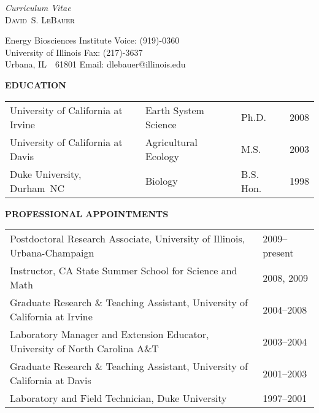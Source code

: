 \documentclass[10pt,twoside]{article}
\begin{document}
\setcounter{page}{1}
\pagestyle{fancy}
\chead{}
\rhead{\thepage}
\lfoot{}
\cfoot{}
\rfoot{}
\newcommand{\dslnote}{\csznote}
\thispagestyle{plain}

\begin{center}
{\textit{Curriculum Vitae}}\\
{\large\textsc{David~S. LeBauer}}\\
\end{center}

Energy Biosciences Institute \hfill Voice: (919)-0360\\
University of Illinois \hfill Fax: (217)-3637  \\
Urbana, IL~~61801 \hfill Email: dlebauer@illinois.edu\\

\bigskip\bigskip

\textbf{EDUCATION}
\begin{table}[h]
\begin{tabular}{ l l l l } 
University of California at Irvine & Earth System Science & Ph.D. & 2008\\
University of California at Davis & Agricultural Ecology & M.S. & 2003 \\
Duke University, Durham~NC & Biology & B.S. Hon. & 1998 \\
\end{tabular}
\end{table}


\textbf{PROFESSIONAL APPOINTMENTS}
\begin{table}[h]
\begin{tabular}{>{\raggedright}p{35.0em}<{} l }
  Postdoctoral Research Associate, University of Illinois, Urbana-Champaign &2009--present \\ 
  Instructor, CA State Summer School for Science and Math & 2008, 2009\\
  Graduate Research \& Teaching Assistant, University of California at Irvine & 2004--2008\\ 
  Laboratory Manager and Extension Educator, University of North Carolina A\&T & 2003--2004\\
  Graduate Research \& Teaching Assistant, University of California at Davis &2001--2003 \\
  Laboratory and Field Technician, Duke University & 1997--2001 \\
\end{tabular}
\end{table}
\end{document}
